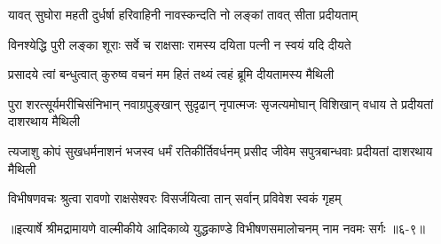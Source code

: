 \twolineshloka
{यावत् सुघोरा महती दुर्धर्षा हरिवाहिनी}
{नावस्कन्दति नो लङ्कां तावत् सीता प्रदीयताम्} %

\twolineshloka
{विनश्येद्धि पुरी लङ्का शूराः सर्वे च राक्षसाः}
{रामस्य दयिता पत्नी न स्वयं यदि दीयते} %

\twolineshloka
{प्रसादये त्वां बन्धुत्वात् कुरुष्व वचनं मम}
{हितं तथ्यं त्वहं ब्रूमि दीयतामस्य मैथिली} %

\twolineshloka
{पुरा शरत्सूर्यमरीचिसंनिभान् नवाग्रपुङ्खान् सुदृढान् नृपात्मजः}
{सृजत्यमोघान् विशिखान् वधाय ते प्रदीयतां दाशरथाय मैथिली} %

\twolineshloka
{त्यजाशु कोपं सुखधर्मनाशनं भजस्व धर्मं रतिकीर्तिवर्धनम्}
{प्रसीद जीवेम सपुत्रबान्धवाः प्रदीयतां दाशरथाय मैथिली} %

\twolineshloka
{विभीषणवचः श्रुत्वा रावणो राक्षसेश्वरः}
{विसर्जयित्वा तान् सर्वान् प्रविवेश स्वकं गृहम्} %


॥इत्यार्षे श्रीमद्रामायणे वाल्मीकीये आदिकाव्ये युद्धकाण्डे विभीषणसमालोचनम् नाम नवमः सर्गः ॥६-९॥
